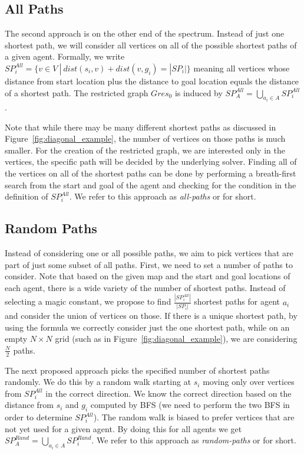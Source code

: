\subsection{All Paths}
The second approach is on the other end of the spectrum. Instead of just one shortest path, we will consider all vertices on all of the possible shortest paths of a given agent. Formally, we write $SP_i^{All} = \{ v \in V \: | \: dist(s_i,v) + dist(v,g_i) = |SP_i|\}$ meaning all vertices whose distance from start location plus the distance to goal location equals the distance of a shortest path. The restricted graph $Gres_{0}$ is induced by $SP_A^{All} = \bigcup_{a_i \in A} SP_i^{All}$.

Note that while there may be many different shortest paths as discussed in Figure~\ref{fig:diagonal_example}, the number of vertices on those paths is much smaller. For the creation of the restricted graph, we are interested only in the vertices, the specific path will be decided by the underlying solver. Finding all of the vertices on all of the shortest paths can be done by performing a breath-first search from the start and goal of the agent and checking for the condition in the definition of $SP_i^{All}$. We refer to this approach as \emph{all-paths} or \psa{} for short.




\subsection{Random Paths}



Instead of considering one or all possible paths, we aim to pick vertices that are part of just some subset of all paths. First, we need to set a number of paths to consider. Note that based on the given map and the start and goal locations of each agent, there is a wide variety of the number of shortest paths. Instead of selecting a magic constant, we propose to find $\frac{|SP_i^{All}|}{|SP_i|}$ shortest paths for agent $a_i$ and consider the union of vertices on those. If there is a unique shortest path, by using the formula we correctly consider just the one shortest path, while on an empty $N \times N$ grid (such as in Figure~\ref{fig:diagonal_example}), we are considering $\frac{N}{2}$ paths.

The next proposed approach picks the specified number of shortest paths randomly. We do this by a random walk starting at $s_i$ moving only over vertices from $SP_i^{All}$ in the correct direction. We know the correct direction based on the distance from $s_i$ and $g_i$ computed by BFS (we need to perform the two BFS in order to determine $SP_i^{All}$). The random walk is biased to prefer vertices that are not yet used for a given agent. By doing this for all agents we get $SP_A^{Rand} = \bigcup_{a_i \in A} SP_i^{Rand}$. We refer to this approach as \emph{random-paths} or \psr{} for short.




